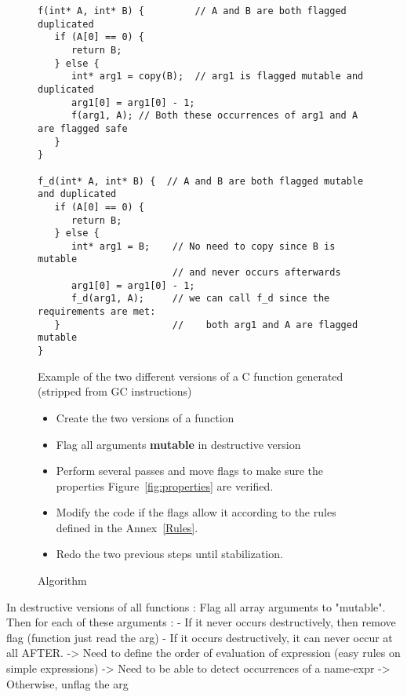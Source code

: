 \documentclass[12pt,a4paper]{article}
\newcommand{\bang}{ \textbf{ mutable } }
\begin{document}
\begin{figure}
\begin{lstlisting}
f(int* A, int* B) {         // A and B are both flagged duplicated
   if (A[0] == 0) {
      return B;
   } else {
      int* arg1 = copy(B);  // arg1 is flagged mutable and duplicated
      arg1[0] = arg1[0] - 1;
      f(arg1, A); // Both these occurrences of arg1 and A are flagged safe
   }
}

f_d(int* A, int* B) {  // A and B are both flagged mutable and duplicated
   if (A[0] == 0) {
      return B;
   } else {
      int* arg1 = B;    // No need to copy since B is mutable
                        // and never occurs afterwards
      arg1[0] = arg1[0] - 1;
      f_d(arg1, A);     // we can call f_d since the requirements are met:
   }                    //    both arg1 and A are flagged mutable
}
\end{lstlisting}
\caption{Example of the two different versions of a C function generated (stripped from GC instructions)}
\end{figure}




\begin{figure}
\begin{itemize}
\item Create the two versions of a function
\item Flag all arguments \bang in destructive version
\item Perform several passes and move flags to make sure the properties Figure~\ref{fig:properties} are verified.
\item Modify the code if the flags allow it according to the rules defined in the Annex~\ref{Rules}.
\item Redo the two previous steps until stabilization.
\end{itemize}
\caption{Algorithm}
\end{figure}





In destructive versions of all functions :
Flag all array arguments to "mutable".
Then for each of these arguments :
  - If it never occurs destructively, then remove flag
          (function just read the arg)
  - If it occurs destructively, it can never occur at all AFTER.
  -> Need to define the order of evaluation of expression
      (easy rules on simple expressions)
  -> Need to be able to detect occurrences of a name-expr
  -> Otherwise, unflag the arg
\end{document}
